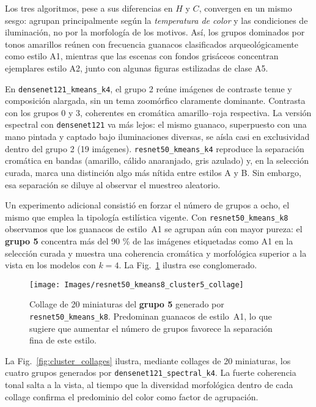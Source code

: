 Los tres algoritmos, pese a sus diferencias en $H$ y $C$, convergen en un mismo sesgo: agrupan principalmente según la \emph{temperatura de color} y las condiciones de iluminación, no por la morfología de los motivos.
Así, los grupos dominados por tonos amarillos reúnen con frecuencia guanacos clasificados arqueológicamente como estilo A1, mientras que las escenas con fondos grisáceos concentran ejemplares estilo A2, junto con algunas figuras estilizadas de clase A5.

En \texttt{densenet121\_kmeans\_k4}, el grupo 2 reúne imágenes de contraste tenue y composición alargada, sin un tema zoomórfico claramente dominante.
Contrasta con los grupos 0 y 3, coherentes en cromática amarillo–roja respectiva.
La versión espectral con \texttt{densenet121} va más lejos: el mismo guanaco, superpuesto con una mano pintada y captado bajo iluminaciones diversas, se aísla casi en exclusividad dentro del grupo 2 (19 imágenes).
\texttt{resnet50\_kmeans\_k4} reproduce la separación cromática en bandas (amarillo, cálido anaranjado, gris azulado) y, en la selección curada, marca una distinción algo más nítida entre estilos A y B.
Sin embargo, esa separación se diluye al observar el muestreo aleatorio.

Un experimento adicional consistió en forzar el número de grupos a ocho, el mismo que emplea la tipología estilística vigente.
Con \texttt{resnet50\_kmeans\_k8} observamos que los guanacos de estilo~A1 se agrupan aún con mayor pureza: el \textbf{grupo 5} concentra más del 90 \% de las imágenes etiquetadas como A1 en la selección curada y muestra una coherencia cromática y morfológica superior a la vista en los modelos con $k=4$.
La Fig.~\ref{fig:r50k8_cluster5} ilustra ese conglomerado.

\begin{figure}[htpb]
  \centering
  \texttt{[image: Images/resnet50\_kmeans8\_cluster5\_collage]}
  \caption{Collage de 20 miniaturas del \textbf{grupo 5} generado por \texttt{resnet50\_kmeans\_k8}.
  Predominan guanacos de estilo~A1, lo que sugiere que aumentar el número de grupos favorece la separación fina de este estilo.}
  \label{fig:r50k8_cluster5}
\end{figure}

La Fig.~\ref{fig:cluster_collages} ilustra, mediante collages de 20 miniaturas, los cuatro grupos generados por \texttt{densenet121\_spectral\_k4}.
La fuerte coherencia tonal salta a la vista, al tiempo que la diversidad morfológica dentro de cada collage confirma el predominio del color como factor de agrupación.

